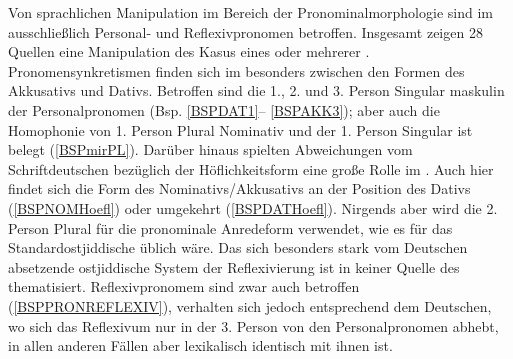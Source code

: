 Von sprachlichen Manipulation im Bereich der Pronominalmorphologie sind im  ausschließlich Personal- und Reflexivpronomen betroffen. Insgesamt  zeigen 28 Quellen eine Manipulation des Kasus eines oder mehrerer . Pronomensynkretismen finden sich im  besonders zwischen den Formen des Akkusativs und Dativs. Betroffen sind die 1., 2. und 3. Person  Singular maskulin der Personalpronomen (Bsp. \ref{BSPDAT1}– \ref{BSPAKK3}); aber auch die Homophonie von 1.  Person Plural Nominativ und  der 1. Person Singular  ist belegt (\ref{BSPmirPL}). Darüber hinaus spielten Abweichungen vom Schriftdeutschen bezüglich der Höflichkeitsform eine große Rolle im . Auch hier findet sich die Form des Nominativs/Akkusativs an der Position des Dativs (\ref{BSPNOMHoefl}) oder umgekehrt (\ref{BSPDATHoefl}). Nirgends aber wird die 2. Person Plural für die pronominale Anredeform verwendet, wie es für das Standardostjiddische üblich wäre. Das sich besonders stark vom Deutschen absetzende ostjiddische System der Reflexivierung ist in keiner Quelle des  thematisiert. Reflexivpronomem sind zwar auch betroffen (\ref{BSPPRONREFLEXIV}), verhalten sich jedoch entsprechend dem Deutschen, wo sich das Reflexivum nur in der 3. Person von den Personalpronomen abhebt, in allen anderen Fällen aber lexikalisch identisch mit ihnen ist.\\ 
 
